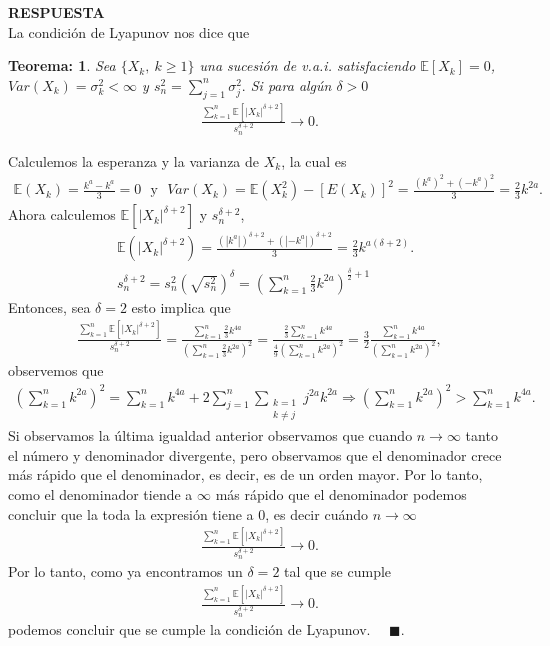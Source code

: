 \documentclass[11pt,letterpaper]{article}
\newcommand{\mE}{\mathbb{E}}
\newcommand{\res}{\textbf{RESPUESTA}\\}
\newcommand{\fin}{$\blacksquare.$}
\newtheorem{thmt}{Teorema:}
\begin{document}
\res La condición de Lyapunov nos dice que 
\begin{framed}
    \begin{thmt} \label{lyapunov}
	Sea $\{X_k,\ k\geq 1 \}$ una sucesión de v.a.i. satisfaciendo $\mE[X_k]=0$, $Var(X_k)=\sigma_k^2 < \infty$ y $s_n^2=\sum_{j=1}^n\sigma_j^2.$ Si para algún $\delta >0$
	\begin{align*}
	\frac{\sum_{k=1}^n\mE\left[|X_k|^{\delta+2} \right]}{s_n^{\delta+2}}\rightarrow 0.
	\end{align*}
    \end{thmt}
\end{framed}
Calculemos la esperanza y la varianza de $X_k$, la cual es
\begin{align*}
\mE(X_k)=\frac{k^a-k^a}{3}=0 \ \ \ \text{y}\ \ \ Var(X_k)=\mE(X_k^2)-[E(X_k)]^2=\frac{(k^a)^2+(-k^a)^2}{3}=\frac{2}{3}k^{2a}.
\end{align*}
Ahora calculemos $\mE[|X_k|^{\delta+2}]$ y $s_n^{\delta+2}$,
\begin{align*}
&\mE(|X_k|^{\delta+2})=\frac{(|k^a|)^{\delta+2}+(|-k^a|)^{\delta+2}}{3}=\frac{2}{3}k^{a(\delta+2)}.\\
&s_n^{\delta+2}=s_n^2\left(\sqrt{s_n^2}\right)^\delta=\left(\sum_{k=1}^n \frac{2}{3}k^{2a}\right)^{\frac{\delta}{2}+1}
\end{align*}
Entonces, sea $\delta=2$ esto implica que 
\begin{align*}
\frac{\sum_{k=1}^n\mE\left[|X_k|^{\delta+2} \right]}{s_n^{\delta+2}}=\frac{\left.\sum_{k=1}^n\frac{2}{3}k^{4a} \right.}{\left(\sum_{k=1}^n \frac{2}{3}k^{2a}\right)^2}=\frac{\frac{2}{3}\left.\sum_{k=1}^nk^{4a} \right.}{\frac{4}{9}\left(\sum_{k=1}^n k^{2a}\right)^2}= \frac{3}{2} \frac{\left.\sum_{k=1}^nk^{4a} \right.}{\left(\sum_{k=1}^n k^{2a}\right)^2},
\end{align*}
observemos que 
\begin{align*}
\left(\sum_{k=1}^nk^{2a}\right)^2=\sum_{k=1}^nk^{4a}+2\sum_{j=1}^n\sum_{\substack{k=1 \\ k\neq j }} j^{2a}k^{2a}\Rightarrow \left(\sum_{k=1}^nk^{2a}\right)^2>\sum_{k=1}^nk^{4a}.
\end{align*}
Si observamos la última igualdad anterior observamos que cuando $n\rightarrow \infty$ tanto el número y denominador divergente, pero observamos que el denominador crece más rápido que el denominador, es decir, es de un orden mayor. Por lo tanto, como el denominador tiende a $\infty$ más rápido que el denominador podemos concluir que la toda la expresión tiene a 0, es decir cuándo $n\rightarrow \infty$
\begin{align*}
\frac{\sum_{k=1}^n\mE\left[|X_k|^{\delta+2} \right]}{s_n^{\delta+2}} \rightarrow 0.
\end{align*}
Por lo tanto, como ya encontramos un $\delta=2$ tal que se cumple
\begin{align*}
\frac{\sum_{k=1}^n\mE\left[|X_k|^{\delta+2} \right]}{s_n^{\delta+2}} \rightarrow 0.
\end{align*}
podemos concluir que se cumple la condición de Lyapunov. \ \ \fin
\end{document}
